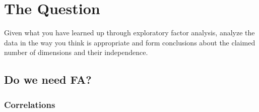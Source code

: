 \documentclass{article}\usepackage[]{graphicx}\usepackage[]{color}
\begin{document}
\section{The Question}
Given what you have learned up through exploratory factor analysis, analyze the data in the way you think is appropriate and form conclusions about the claimed number of dimensions and their independence.



\subsection{Do we need FA?}

\subsubsection{Correlations}
\end{document}
